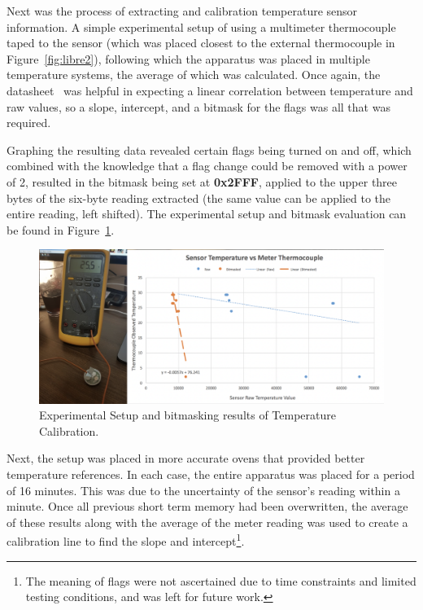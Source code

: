 Next was the process of extracting and calibration temperature sensor information. A simple experimental setup of using a multimeter thermocouple taped to the sensor (which was placed closest to the external thermocouple in Figure~\ref{fig:libre2}), following which the apparatus was placed in multiple temperature systems, the average of which was calculated. Once again, the datasheet~\cite{noauthor_rf430frl152h_nodate} was helpful in expecting a linear correlation between temperature and raw values, so a slope, intercept, and a bitmask for the flags was all that was required.

Graphing the resulting data revealed certain flags being turned on and off, which combined with the knowledge that a flag change could be removed with a power of 2, resulted in the bitmask being set at \textbf{0x2FFF}, applied to the upper three bytes of the six-byte reading extracted (the same value can be applied to the entire reading, left shifted). The experimental setup and bitmask evaluation can be found in Figure~\ref{fig:tempcalsetup}.

\begin{figure}[ht]
\centering\includegraphics[width=1.0\linewidth]{images/tempcalsetup.png}
\caption{Experimental Setup and bitmasking results of Temperature Calibration.}
\label{fig:tempcalsetup}
\end{figure}

Next, the setup was placed in more accurate ovens that provided better temperature references. In each case, the entire apparatus was placed for a period of 16 minutes. This was due to the uncertainty of the sensor's reading within a minute. Once all previous short term memory had been overwritten, the average of these results along with the average of the meter reading was used to create a calibration line to find the slope and intercept\footnote{The meaning of flags were not ascertained due to time constraints and limited testing conditions, and was left for future work.}. 

